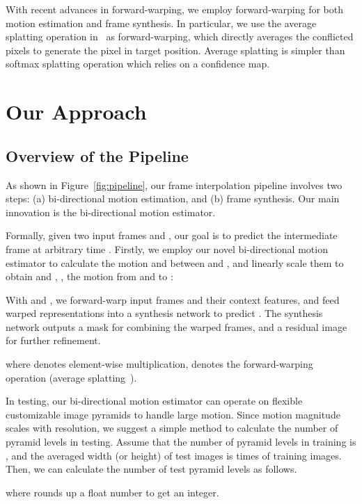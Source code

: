 \documentclass[10pt,twocolumn,letterpaper]{article}
\begin{document}
With recent advances in forward-warping, we employ forward-warping for both
motion estimation and frame synthesis. In particular, we use the average
splatting operation in~\cite{niklaus2020softmax} as forward-warping, which
directly averages the conflicted pixels to generate the pixel in target
position. Average splatting is simpler than softmax splatting operation which
relies on a confidence map.



\section{Our Approach}

\subsection{Overview of the Pipeline}\label{subsec:pipe-overview} As shown in
Figure~\ref{fig:pipeline}, our frame interpolation pipeline involves two steps:
(a) bi-directional motion estimation, and (b) frame synthesis. Our main
innovation is the bi-directional motion estimator. 


Formally, given two input frames  and , our goal is to predict the
intermediate frame  at arbitrary time . Firstly, we employ
our novel bi-directional motion estimator to calculate the motion  and  between  and , and linearly
scale them to obtain  and , \ie, the
motion from  and  to :

With  and , we forward-warp input
frames and their context features, and feed warped representations into a
synthesis network to predict . The synthesis network outputs a mask  for
combining the warped frames, and a residual image  for further
refinement.

where  denotes element-wise multiplication,  denotes the forward-warping operation (average
splatting~\cite{niklaus2020softmax}).



In testing, our bi-directional motion estimator can operate on flexible
customizable image pyramids to handle large motion.  Since motion magnitude
scales with resolution, we suggest a simple method to calculate the number of
pyramid levels in testing. Assume that the number of pyramid levels in training
is , and the averaged width (or height) of test images is  times
of training images. Then, we can calculate the number of test pyramid levels as
follows.

where  rounds up a float number to get an integer.
\end{document}
